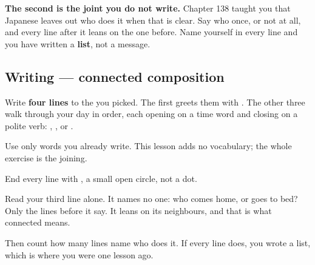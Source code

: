 \textbf{The second is the joint you do not write.} Chapter 138 taught you that Japanese leaves out who does it when that is clear. Say who once, or not at all, and every line after it leans on the one before. Name yourself in every line and you have written a \textbf{list}, not a message.

\subsection*{Writing — connected composition}
Write \textbf{four lines} to the \textbf{} you picked. The first greets them with \textbf{}. The other three walk through your day in order, each opening on a time word and closing on a polite verb: \textbf{}, \textbf{}, \textbf{} or \textbf{}.

Use only words you already write. This lesson adds no vocabulary; the whole exercise is the joining.

End every line with \textbf{}, a small open circle, not a dot.

\begin{tcolorbox}[breakable,colback=teal!4,colframe=teal!35!black,title={Before you move on}]
Read your third line alone. It names no one: who comes home, or goes to bed? Only the lines before it say. It leans on its neighbours, and that is what connected means.

Then count how many lines name who does it. If every line does, you wrote a list, which is where you were one lesson ago.
\end{tcolorbox}
